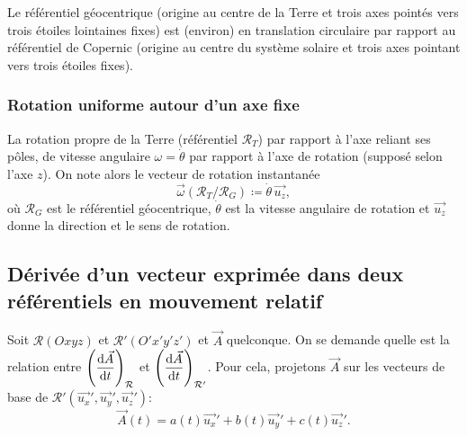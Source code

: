             \begin{example}
                Le référentiel géocentrique (origine au centre de la Terre et trois axes pointés vers trois étoiles lointaines \og fixes\fg) est (environ) en translation circulaire par rapport au référentiel de Copernic (origine au centre du système solaire et trois axes pointant vers trois étoiles \og fixes\fg).
            \end{example}

        \subsubsection{Rotation uniforme autour d'un axe fixe}
            
            \begin{example}
                La rotation propre de la Terre (référentiel $\mathcal{R}_{T}$) par rapport à l'axe reliant ses pôles, de vitesse angulaire $\omega=\dot{\theta}$ par rapport à l'axe de rotation (supposé selon l'axe $z$). On note alors le vecteur de rotation instantanée
                \begin{equation*}
                    \vec{\omega}(\mathcal{R}_{T}/\mathcal{R}_{G})\coloneqq \dot{\theta}\,\vec{u_z},
                \end{equation*}
                où $\mathcal{R}_{G}$ est le référentiel géocentrique, $\dot{\theta}$ est la vitesse angulaire de rotation et $\vec{u_z}$ donne la direction et le sens de rotation.
            \end{example}

    \subsection{Dérivée d'un vecteur exprimée dans deux référentiels en mouvement relatif}

        Soit $\mathcal{R}(Oxyz)$ et $\mathcal{R}'(O'x'y'z')$ et $\vec{A}$ quelconque. On se demande quelle est la relation entre $\left(\dfrac{\mathrm{d}\vec{A}}{\mathrm{d} t}\right)_{\mathcal{R}}$ et $\left(\dfrac{\mathrm{d}\vec{A}}{\mathrm{d} t}\right)_{\mathcal{R}'}$. Pour cela, projetons $\vec{A}$ sur les vecteurs de base de $\mathcal{R}'(\vec{u_x}',\vec{u_y}',\vec{u_z}')$:
        \begin{equation*}
            \vec{A}(t) = a(t)\vec{u_x}'+b(t)\vec{u_y}'+c(t)\vec{u_z}'.
        \end{equation*}

